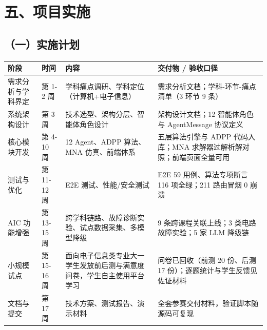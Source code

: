 \documentclass[zihao=-4,a4paper,UTF8,fontset=windows]{ctexart}
\begin{document}
\par\noindent\begin{minipage}{\linewidth}
\section{五、项目实施}
\subsection{（一）实施计划}
\par\noindent\begin{tabular}{|p{2.5cm}|p{2.5cm}|p{4.0cm}|p{4.3cm}|}
\hline
\textbf{阶段} & \textbf{时间} & \textbf{内容} & \textbf{交付物 / 验收口径} \\ \hline
需求分析与学科界定 & 第 1-2 周 & 学科痛点调研、学科定位（计算机+电子信息） & 需求分析文档；学科-环节-痛点清单（3 环节 9 条） \\ \hline
系统架构设计 & 第 3 周 & 技术选型、架构分层、智能体角色设计 & 架构设计文档；12 智能体角色与 AgentMessage 协议定义 \\ \hline
核心模块开发 & 第 4-10 周 & 12 Agent、ADPP 算法、MNA 仿真、前端体系 & 五层算法引擎与 ADPP 代码入库；MNA 求解器过解析解对照；前端页面全量可用 \\ \hline
测试与优化 & 第 11-12 周 & E2E 测试、性能/安全测试 & E2E 59 用例、算法专项断言 116 项全绿；211 路由冒烟 0 崩溃 \\ \hline
AIC 功能增强 & 第 13-15 周 & 跨学科链路、故障诊断实验、试点数据采集、多模型降级 & 9 条跨课程关联上线；3 类电路故障实验；5 家 LLM 降级链 \\ \hline
小规模试点 & 第 15-16 周 & 面向电子信息类专业大一学生发放前后测与满意度问卷，学生自主使用平台学习 & 问卷已回收（前测 20 份、后测 17 份）；逐题统计与学生反馈见佐证材料 \\ \hline
文档与提交 & 第 17 周 & 技术方案、测试报告、演示材料 & 全套参赛交付材料，验证脚本随源码可复现 \\ \hline
\end{tabular}\par
\end{minipage}\par
\end{document}
